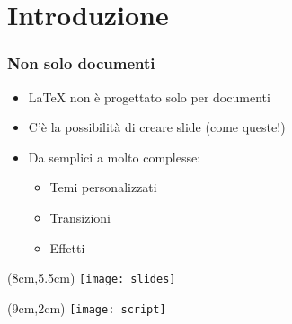\section{Introduzione}
\begin{frame}
 
 \frametitle{Non solo documenti}
 
 \begin{itemize}
  \item<1-> \LaTeX{} non è progettato solo per documenti
  \item<2-> C'è la possibilità di creare slide (come queste!)
  \item<3-> Da semplici a molto complesse:
  \begin{itemize}
   \item Temi personalizzati
   \item Transizioni
   \item Effetti
  \end{itemize}

 \end{itemize}
 
 \begin{textblock*}{5cm}(8cm,5.5cm)
   \texttt{[image: slides]}
 \end{textblock*}
 
 \begin{textblock*}{5cm}(9cm,2cm)
   \texttt{[image: script]}
 \end{textblock*}
\end{frame}
